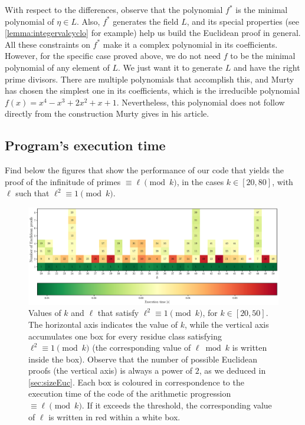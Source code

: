 \documentclass[../main.tex]{subfiles}
\begin{document}
	With respect to the differences, observe that the polynomial $f^*$ is the minimal polynomial of $\eta\in L$. Also, $f^*$ generates the field $L$, and its special properties (see \cref{lemma:integervalcyclo} for example) help us build the Euclidean proof in general. All these constraints on $f^*$ make it a complex polynomial in its coefficients. However, for the specific case proved above, we do not need $f$ to be the minimal polynomial of any element of $L$. We just want it to generate $L$ and have the right prime divisors. There are multiple polynomials that accomplish this, and Murty has chosen the simplest one in its coefficients, which is the irreducible polynomial $f(x)=x^4-x^3+2x^2+x+1$. Nevertheless, this polynomial does not follow directly from the construction Murty gives in his article.

\subsection{Program's execution time}\label{sec:exectime}

Find below the figures that show the performance of our code that yields the proof of the infinitude of primes $\equiv\ell\pmod{k}$, in the cases $k\in[20,80]$, with $\ell$ such that $\ell^2\equiv 1\pmod{k}$.

\begin{figure}
	\centering
	\vspace*{-3in}
	\includegraphics[width=\textwidth]{Images/running_times_20_50.eps}
	\caption{Values of $k$ and $\ell$ that satisfy $\ell^2\equiv 1 \pmod{k}$, for $k\in[20,50]$. The horizontal axis indicates the value of $k$, while the vertical axis accumulates one box for every residue class satisfying $\ell^2\equiv 1 \pmod{k}$ (the corresponding value of $\ell \bmod{k}$ is written inside the box). Observe that the number of possible Euclidean proofs (the vertical axis) is always a power of $2$, as we deduced in \cref{sec:sizeEuc}. Each box is coloured in correspondence to the execution time of the code of the arithmetic progression $\equiv\ell\pmod{k}$. If it exceeds the threshold, the corresponding value of $\ell$ is written in red within a white box.} 
	\label{fig:colouredmatrix}
\end{figure}
\end{document}
